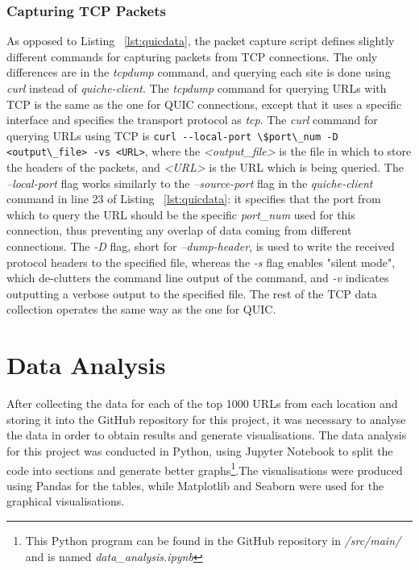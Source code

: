 \documentclass{l4proj}
\begin{document}
\subsubsection{Capturing TCP Packets} As opposed to Listing ~\ref{lst:quicdata}, the packet capture script defines slightly different commands for capturing packets from TCP connections. The only differences are in the \emph{tcpdump} command, and querying each site is done using \emph{curl} instead of \emph{quiche-client}. The \emph{tcpdump} command for querying URLs with TCP is the same as the one for QUIC connections, except that it uses a specific interface and specifies the transport protocol as \emph{tcp}. The \emph{curl} command for querying URLs using TCP is \lstinline{curl --local-port \$port\_num -D <output\_file> -vs <URL>}, where the \emph{<output\_file>} is the file in which to store the headers of the packets, and \emph{<URL>} is the URL which is being queried. The \emph{--local-port} flag works similarly to the \emph{--source-port} flag in the \emph{quiche-client} command in line 23 of Listing ~\ref{lst:quicdata}: it specifies that the port from which to query the URL should be the specific \emph{port\_num} used for this connection, thus preventing any overlap of data coming from different connections. The \emph{-D} flag, short for \emph{--dump-header}, is used to write the received protocol headers to the specified file, whereas the \emph{-s} flag enables "silent mode", which de-clutters the command line output of the command, and \emph{-v} indicates outputting a verbose output to the specified file. The rest of the TCP data collection operates the same way as the one for QUIC.


\section{Data Analysis}

After collecting the data for each of the top 1000 URLs from each location and storing it into the GitHub repository for this project, it was necessary to analyse the data in order to obtain results and generate visualisations. The data analysis for this project was conducted in Python, using Jupyter Notebook to split the code into sections and generate better graphs\footnote{This Python program can be found in the GitHub repository in \emph{/src/main/} and is named \emph{data\_analysis.ipynb}}.The visualisations were produced using Pandas for the tables, while Matplotlib and Seaborn were used for the graphical visualisations.
\end{document}
